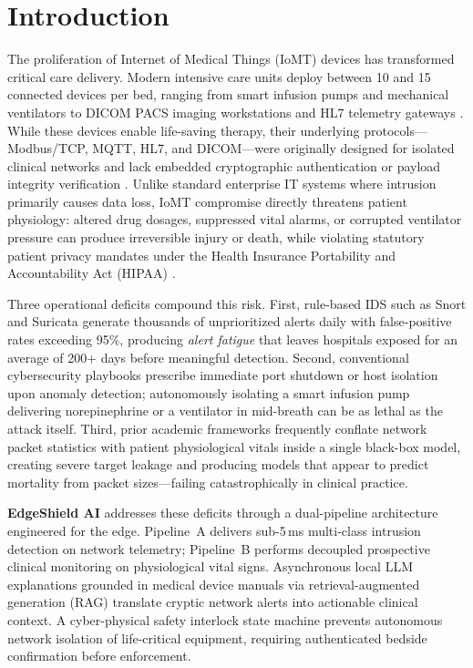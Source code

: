 \documentclass[conference]{IEEEtran}
\begin{document}
\section{Introduction}
The proliferation of Internet of Medical Things (IoMT) devices has transformed critical care delivery. Modern intensive care units deploy between 10 and 15 connected devices per bed, ranging from smart infusion pumps and mechanical ventilators to DICOM PACS imaging workstations and HL7 telemetry gateways \cite{iotmtthreat}. While these devices enable life-saving therapy, their underlying protocols---Modbus/TCP, MQTT, HL7, and DICOM---were originally designed for isolated clinical networks and lack embedded cryptographic authentication or payload integrity verification \cite{edgehealth}. Unlike standard enterprise IT systems where intrusion primarily causes data loss, IoMT compromise directly threatens patient physiology: altered drug dosages, suppressed vital alarms, or corrupted ventilator pressure can produce irreversible injury or death, while violating statutory patient privacy mandates under the Health Insurance Portability and Accountability Act (HIPAA) \cite{hipaa}.

Three operational deficits compound this risk. First, rule-based IDS such as Snort \cite{snort} and Suricata generate thousands of unprioritized alerts daily with false-positive rates exceeding 95\%, producing \emph{alert fatigue} that leaves hospitals exposed for an average of 200+ days before meaningful detection. Second, conventional cybersecurity playbooks prescribe immediate port shutdown or host isolation upon anomaly detection; autonomously isolating a smart infusion pump delivering norepinephrine or a ventilator in mid-breath can be as lethal as the attack itself. Third, prior academic frameworks frequently conflate network packet statistics with patient physiological vitals inside a single black-box model, creating severe target leakage and producing models that appear to predict mortality from packet sizes---failing catastrophically in clinical practice.

\textbf{EdgeShield AI} addresses these deficits through a dual-pipeline architecture engineered for the edge. Pipeline~A delivers sub-5\,ms multi-class intrusion detection on network telemetry; Pipeline~B performs decoupled prospective clinical monitoring on physiological vital signs. Asynchronous local LLM explanations grounded in medical device manuals via retrieval-augmented generation (RAG) translate cryptic network alerts into actionable clinical context. A cyber-physical safety interlock state machine prevents autonomous network isolation of life-critical equipment, requiring authenticated bedside confirmation before enforcement.
\end{document}

